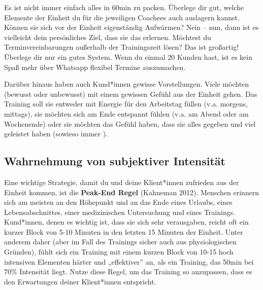 \documentclass[
  letterpaper,
  DIV=11,
  numbers=noendperiod]{scrreprt}
\begin{document}
Es ist nicht immer einfach alles in 60min zu packen. Überlege dir gut,
welche Elemente der Einheit du für die jeweiligen Coachees auch
auslagern kannst. Können sie sich vor der Einheit eigenständig
Aufwärmen? Nein -- nun, dann ist es vielleicht dein persönliches Ziel,
dass sie das erlernen. Möchtest du Terminvereinbarungen außerhalb der
Trainingszeit lösen? Das ist großartig! Überlege dir nur ein gutes
System. Wenn du einmal 20 Kunden hast, ist es kein Spaß mehr über
Whatsapp flexibel Termine auszumachen.

Darüber hinaus haben auch Kund*innen gewisse Vorstellungen. Viele
möchten (bewusst oder unbewusst) mit einem gewissen Gefühl aus der
Einheit gehen. Das Training soll sie entweder mit Energie für den
Arbeitstag füllen (v.a. morgens, mittags), sie möchten sich am Ende
entspannt fühlen (v.a. am Abend oder am Wochenende) oder sie möchten das
Gefühl haben, dass sie alles gegeben und viel geleistet haben (sowieso
immer ).

\subsection{Wahrnehmung von subjektiver
Intensität}\label{wahrnehmung-von-subjektiver-intensituxe4t}

Eine wichtige Strategie, damit du und deine Klient*innen zufrieden aus
der Einheit kommen, ist die \textbf{Peak-End Regel} (Kahneman 2012).
Menschen erinnern sich am meisten an den Höhepunkt und an das Ende eines
Urlaubs, eines Lebensabschnittes, einer medizinischen Untersuchung und
eines Trainings. Kund*innen, denen es wichtig ist, dass sie sich sehr
verausgaben, reicht oft ein kurzer Block von 5-10 Minuten in den letzten
15 Minuten der Einheit. Unter anderem daher (aber im Fall des Trainings
sicher auch aus physiologischen Gründen), fühlt sich ein Training mit
einem kurzen Block von 10-15 hoch intensiven Elementen härter und
„effektiver'' an, als ein Training, das 50min bei 70\% Intensität liegt.
Nutze diese Regel, um das Training so anzupassen, dass es den
Erwartungen deiner Klient*innen entspricht.
\end{document}

